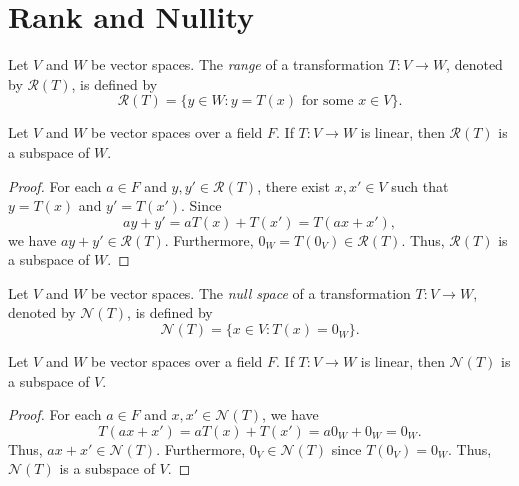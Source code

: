 \section{Rank and Nullity}
\begin{definition}
  \label{def:range}
  Let $V$ and $W$ be vector spaces.
  The \emph{range} of a transformation $T: V \to W$, denoted by
  $\mathcal{R}(T)$, is defined by
  \begin{equation*}
    \mathcal{R}(T) = \{y \in W : \text{$y = T(x)$ for some $x \in V$}\}.
  \end{equation*}
\end{definition}

\begin{proposition}
  \label{prop:range}
  Let $V$ and $W$ be vector spaces over a field $F$.
  If $T: V \to W$ is linear, then $\mathcal{R}(T)$ is a subspace of $W$.
\end{proposition}
\begin{proof}
  For each $a \in F$ and $y, y' \in \mathcal{R}(T)$, there exist $x, x' \in V$
  such that $y = T(x)$ and $y' = T(x')$.
  Since
  \begin{equation*}
    ay + y' = aT(x) + T(x') = T(ax + x'),
  \end{equation*}
  we have $ay + y' \in \mathcal{R}(T)$.
  Furthermore, $0_W = T(0_V) \in \mathcal{R}(T)$.
  Thus, $\mathcal{R}(T)$ is a subspace of $W$.
\end{proof}

\begin{definition}
  \label{def:null-space}
  Let $V$ and $W$ be vector spaces.
  The \emph{null space} of a transformation $T: V \to W$, denoted by
  $\mathcal{N}(T)$, is defined by
  \begin{equation*}
    \mathcal{N}(T) = \{x \in V : T(x) = 0_W\}.
  \end{equation*}
\end{definition}

\begin{proposition}
  \label{prop:null-space}
  Let $V$ and $W$ be vector spaces over a field $F$.
  If $T: V \to W$ is linear, then $\mathcal{N}(T)$ is a subspace of $V$.
\end{proposition}
\begin{proof}
  For each $a \in F$ and $x, x' \in \mathcal{N}(T)$, we have
  \begin{equation*}
    T(ax + x') = aT(x) + T(x') = a0_W + 0_W = 0_W.
  \end{equation*}
  Thus, $ax + x' \in \mathcal{N}(T)$.
  Furthermore, $0_V \in \mathcal{N}(T)$ since $T(0_V) = 0_W$.
  Thus, $\mathcal{N}(T)$ is a subspace of $V$.
\end{proof}


